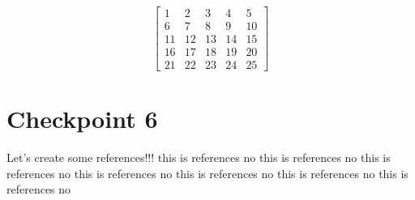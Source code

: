 \documentclass[a4paper,12pt]{article}
\begin{document}
\begin{equation}
    \left[
    \begin{matrix}
    1 & 2 & 3 & 4 & 5 \\
    6 & 7 & 8 & 9 & 10 \\
    11 & 12 & 13 & 14 & 15 \\
    16 & 17 & 18 & 19 & 20 \\
    21 & 22 & 23 & 24 & 25
    \end{matrix}
    \right]
\end{equation}


\newpage

\section{Checkpoint 6}
Let's create some references!!!
this is references no \cite{wohn2011s}
this is references no \cite{ducheneaut2006alone}
this is references no \cite{freeman2015simulating}
this is references no \cite{freeman2016intimate}
this is references no \cite{freeman2016revisiting}
this is references no \cite{hamari2017esports}
this is references no \cite{hamilton2012high}
\cite{hamilton2012pen}
\cite{jonasson2010electronic}
\cite{kaytoue2012watch}
\cite{kostakos2005social}
\cite{kow2013media}
\cite{leavitt2016ping}
\cite{lee2011comparison}
\cite{wagner1968glaser}




\end{document}
